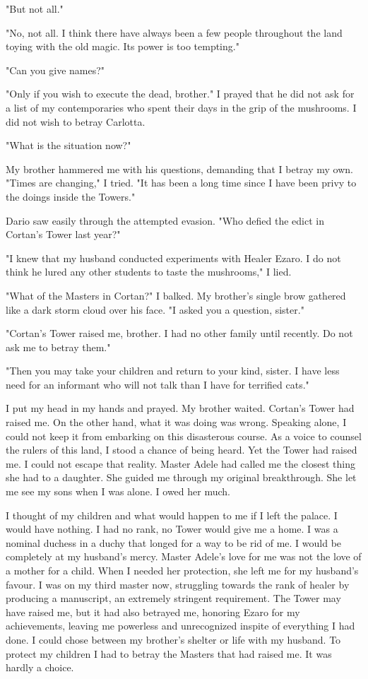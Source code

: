\documentclass{article}
\begin{document}
"But not all."

"No, not all. I think there have always been a few people throughout the land toying with the old magic. Its power is too tempting."

"Can you give names?"

"Only if you wish to execute the dead, brother." I prayed that he did not ask for a list of my contemporaries who spent their days in the grip of the mushrooms. I did not wish to betray Carlotta.

"What is the situation now?"

My brother hammered me with his questions, demanding that I betray my own. "Times are changing," I tried. "It has been a long time since I have been privy to the doings inside the Towers."

Dario saw easily through the attempted evasion. "Who defied the edict in Cortan's Tower last year?"

"I knew that my husband conducted experiments with Healer Ezaro. I do not think he lured any other students to taste the mushrooms," I lied.

"What of the Masters in Cortan?" I balked. My brother's single brow gathered like a dark storm cloud over his face. "I asked you a question, sister."

"Cortan's Tower raised me, brother. I had no other family until recently. Do not ask me to betray them."

"Then you may take your children and return to your kind, sister. I have less need for an informant who will not talk than I have for terrified cats."

I put my head in my hands and prayed. My brother waited. Cortan's Tower had raised me. On the other hand, what it was doing was wrong. Speaking alone, I could not keep it from embarking on this disasterous course. As a voice to counsel the rulers of this land, I stood a chance of being heard. Yet the Tower had raised me. I could not escape that reality. Master Adele had called me the closest thing she had to a daughter. She guided me through my original breakthrough. She let me see my sons when I was alone. I owed her much. 

I thought of my children and what would happen to me if I left the palace. I would have nothing. I had no rank, no Tower would give me a home. I was a nominal duchess in a duchy that longed for a way to be rid of me. I would be completely at my husband's mercy. Master Adele's love for me was not the love of a mother for a child. When I needed her protection, she left me for my husband's favour. I was on my third master now, struggling towards the rank of healer by producing a manuscript, an extremely stringent requirement. The Tower may have raised me, but it had also betrayed me, honoring Ezaro for my achievements, leaving me powerless and unrecognized inspite of everything I had done. I could chose between my brother's shelter or life with my husband. To protect my children I had to betray the Masters that had raised me. It was hardly a choice. 
\end{document}

